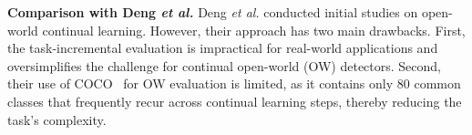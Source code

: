 \noindent\textbf{Comparison with Deng \emph{et al.} }
Deng \emph{et al.}\cite{deng2024zero} conducted initial studies on open-world continual learning. However, their approach has two main drawbacks. First, the task-incremental evaluation is impractical for real-world applications and oversimplifies the challenge for continual open-world (OW) detectors. Second, their use of COCO~\cite{lin2014microsoft} for OW evaluation is limited, as it contains only 80 common classes that frequently recur across continual learning steps, thereby reducing the task's complexity.
